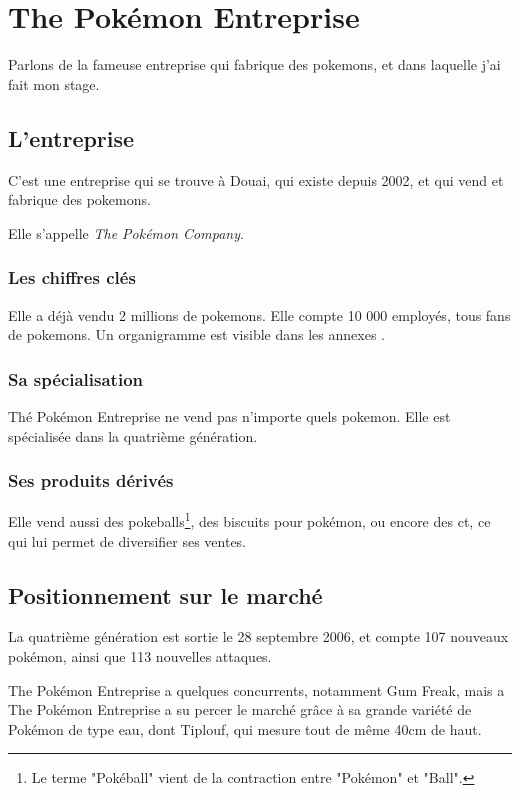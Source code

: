 \documentclass[../main.tex]{subfiles}
\begin{document}
\section{The Pokémon Entreprise}

Parlons de la fameuse entreprise qui fabrique des \glspl{pokemon}, et dans laquelle j'ai fait mon stage.

\subsection{L'entreprise}
C'est une entreprise qui se trouve à Douai, qui existe depuis 2002, et qui vend et fabrique des \Glspl{pokemon}.

Elle s'appelle \textit{The Pokémon Company}.

\subsubsection{Les chiffres clés}
Elle a déjà vendu 2 millions de \Glspl{pokemon}. Elle compte 10 000 employés, tous fans de \Glspl{pokemon}.
Un organigramme est visible dans les annexes \figref{\ref{fig:organigramme}}.

\subsubsection{Sa spécialisation}
Thé Pokémon Entreprise ne vend pas n'importe quels \gls{pokemon}. Elle est spécialisée dans la quatrième génération.

\subsubsection{Ses produits dérivés}
Elle vend aussi des \glspl{pokeball}\footnote{Le terme "Pokéball" vient de la contraction entre "Pokémon" et "Ball".}, des biscuits pour pokémon, ou encore des \acrfull{ct}, ce qui lui permet de diversifier ses ventes.

\subsection{Positionnement sur le marché}

La quatrième génération est sortie le 28 septembre 2006, et compte 107 nouveaux pokémon, ainsi que 113 nouvelles attaques.

The Pokémon Entreprise a quelques concurrents, notamment Gum Freak, mais a The Pokémon Entreprise a su percer le marché grâce à sa grande variété de Pokémon de type eau, dont Tiplouf, qui mesure tout de même 40cm de haut.
\end{document}
